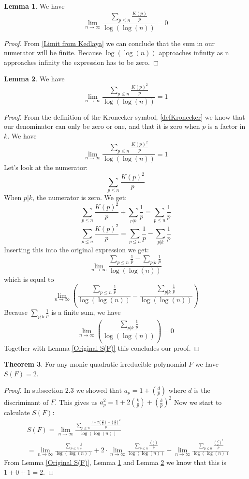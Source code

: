 \documentclass{article}
\theoremstyle{definition}
\newtheorem{theorem}{Theorem}[section]
\newtheorem{lemma}[theorem]{Lemma}
\theoremstyle{remark}
\begin{document}
\begin{lemma}\label{2limK(p)}
We have
$$\lim_{n \rightarrow \infty} \frac{\sum_{p\leq n}\frac{K(p)}{p}}{\log(\log(n))}=0$$
\end{lemma}
\begin{proof}
From \ref{Limit from Kedlaya} we can conclude that the sum in our numerator will be finite. Because $\log(\log(n))$ approaches infinity as n approaches infinity the expression has to be zero.
\end{proof}
\begin{lemma}\label{K(p) squared}
We have
$$\lim_{n \rightarrow \infty}\frac{\sum_{p \leq n}\frac{K(p)^2}{p}}{\log(\log(n))} =1$$
\end{lemma}
\begin{proof}
From the definition of the Kronecker symbol, \ref{defKronecker} we know that our denominator can only be zero or one, and that it is zero when $p$ is a factor in $k$. We have
$$\lim_{n \rightarrow \infty}\frac{\sum_{p \leq n}\frac{K(p)^2}{p}}{\log(\log(n))} =1$$
Let's look at the numerator:
$$\sum_{p \leq n}\frac{K(p)^2}{p}$$
When $p\vert k$, the numerator is zero. We get:
$$\sum_{p \leq n}\frac{K(p)^2}{p}+\sum_{p\vert k}\frac{1}{p}=\sum_{p\leq n}\frac{1}{p}$$
$$\sum_{p \leq n}\frac{K(p)^2}{p}=\sum_{p\leq n}\frac{1}{p}-\sum_{p\vert k}\frac{1}{p}$$
Inserting this into the original expression we get:
$$\lim_{n \rightarrow \infty}\frac{\sum_{p\leq n}\frac{1}{p}-\sum_{p\vert k}\frac{1}{p}}{\log(\log(n))}$$
which is equal to
$$\lim_{n \rightarrow \infty}\left(\frac{\sum_{p\leq n}\frac{1}{p}}{\log(\log(n))}-\frac{\sum_{p\vert k}\frac{1}{p}}{\log(\log(n))}\right)$$
Because $\sum_{p\vert k}\frac{1}{p}$ is a finite sum, we have
$$\lim_{n \rightarrow \infty}\left(\frac{\sum_{p\vert k}\frac{1}{p}}{\log(\log(n))}\right)=0$$
Together with Lemma \ref{Original S(F)} this concludes our proof.
\end{proof}
\begin{theorem}\label{S is 2}
For any monic quadratic irreducible polynomial $F$ we have $S(F)=2$.
\end{theorem}
\begin{proof}
In subsection 2.3 we showed that $a_p = 1+(\frac{d}{p})$ where $d$ is the discriminant of $F$. This gives us $a_p^2=1+2(\frac{k}{p})+(\frac{k}{p})^2$ Now we start to calculate $S(F)$:
\begin{equation}
\begin{split}
& S(F)=\lim_{n \rightarrow \infty} \frac{\sum _{p\leq n}\frac{1+2(\frac{d}{p})+(\frac{d}{p})^2}{p} }{\log(\log(n))} \\
& = \lim_{n \rightarrow \infty} \frac{\sum_{p \leq n}\frac{1}{p}}{\log(\log(n))} + 2\cdot \lim_{n \rightarrow \infty} \frac{\sum_{p\leq n}\frac{(\frac{d}{p})}{p}}{\log(\log(n))} + \lim_{n \rightarrow \infty}\frac{\sum_{p \leq n}\frac{(\frac{d}{p})^2}{p}}{\log(\log(n))}
\end{split}
\end{equation}
From Lemma \ref{Original S(F)}, Lemma \ref{2limK(p)} and Lemma \ref{K(p) squared} we know that this is $1+0+1=2$.
\end{proof}
\end{document}
